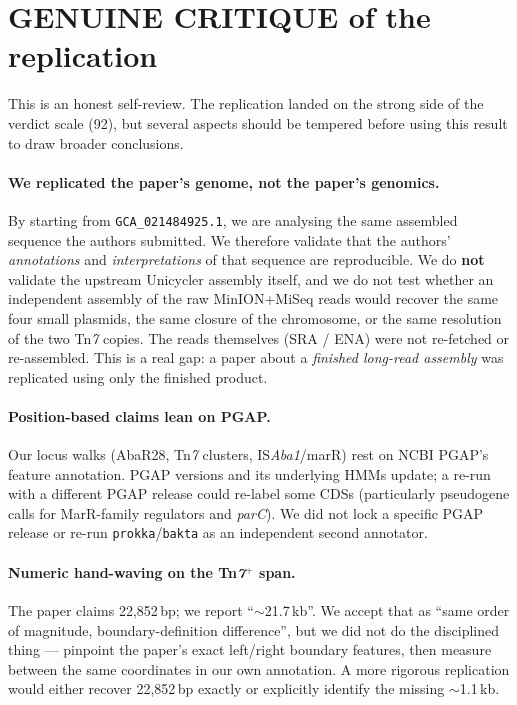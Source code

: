 \documentclass[11pt]{article}
\begin{document}
\section{GENUINE CRITIQUE of the replication}

This is an honest self-review.  The replication landed on the strong side
of the verdict scale (92), but several aspects should be tempered before
using this result to draw broader conclusions.

\paragraph{We replicated the paper's genome, not the paper's genomics.}
By starting from \texttt{GCA\_021484925.1}, we are analysing the
same assembled sequence the authors submitted.  We therefore validate
that the authors' \emph{annotations} and \emph{interpretations} of that
sequence are reproducible.  We do \textbf{not} validate the upstream
Unicycler assembly itself, and we do not test whether an independent
assembly of the raw MinION+MiSeq reads would recover the same four
small plasmids, the same closure of the chromosome, or the same
resolution of the two Tn\emph{7} copies.  The reads themselves
(SRA / ENA) were not re-fetched or re-assembled.  This is a real gap:
a paper about a \emph{finished long-read assembly} was replicated using
only the finished product.

\paragraph{Position-based claims lean on PGAP.}
Our locus walks (AbaR28, Tn\emph{7} clusters, IS\emph{Aba1}/marR)
rest on NCBI PGAP's feature annotation.  PGAP versions and its
underlying HMMs update; a re-run with a different PGAP release could
re-label some CDSs (particularly pseudogene calls for MarR-family
regulators and \emph{parC}).  We did not lock a specific PGAP release
or re-run \texttt{prokka}/\texttt{bakta} as an independent second
annotator.

\paragraph{Numeric hand-waving on the Tn\emph{7}$^{+}$ span.}
The paper claims 22{,}852\,bp; we report ``$\sim$21.7\,kb''.  We accept
that as ``same order of magnitude, boundary-definition difference'',
but we did not do the disciplined thing --- pinpoint the paper's exact
left/right boundary features, then measure between the same coordinates
in our own annotation.  A more rigorous replication would either
recover 22{,}852\,bp exactly or explicitly identify the missing
$\sim$1.1\,kb.
\end{document}
